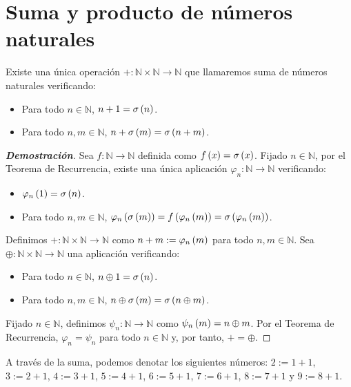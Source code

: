 \section{Suma y producto de números naturales}

\begin{proposition}
  \rm Existe una única operación $+:\mathbb{N}\times\mathbb{N}\rightarrow\mathbb{N}$ que llamaremos suma de números naturales verificando:

  \begin{itemize}
    \item[1.] Para todo $n\in\mathbb{N}$, $n+1=\sigma\left(n\right)$.
    \item[2.] Para todo $n,m\in\mathbb{N}$, $n+\sigma\left(m\right)=\sigma\left(n+m\right)$.
  \end{itemize}
\begin{proof}[\rm\textbf{Demostración}]
  Sea $f:\mathbb{N}\rightarrow\mathbb{N}$ definida como $f\left(x\right)=\sigma\left(x\right)$. Fijado $n\in\mathbb{N}$, por el Teorema de Recurrencia, existe una única aplicación $\varphi_n:\mathbb{N}\rightarrow\mathbb{N}$ verificando:

  \begin{itemize}
  \item[1.] $\varphi_n\left(1\right)=\sigma\left(n\right)$.
  \item[2.] Para todo $n,m\in\mathbb{N}$, $\varphi_n\left(\sigma\left(m\right)\right)=f\left(\varphi_n\left(m\right)\right)=\sigma\left(\varphi_n\left(m\right)\right)$.
  \end{itemize}
  
  Definimos $+:\mathbb{N}\times\mathbb{N}\rightarrow\mathbb{N}$ como $n+m:=\varphi_n\left(m\right)$ para todo $n,m\in\mathbb{N}$. Sea $\oplus:\mathbb{N}\times\mathbb{N}\rightarrow\mathbb{N}$ una aplicación verificando:

  \begin{itemize}
    \item[1.] Para todo $n\in\mathbb{N}$, $n\oplus 1=\sigma\left(n\right)$.
    \item[2.] Para todo $n,m\in\mathbb{N}$, $n\oplus\sigma\left(m\right)=\sigma\left(n\oplus m\right)$.
  \end{itemize}

  Fijado $n\in\mathbb{N}$, definimos $\psi_n:\mathbb{N}\rightarrow\mathbb{N}$ como $\psi_n\left(m\right)=n\oplus m$. Por el Teorema de Recurrencia, $\varphi_n=\psi_n$ para todo $n\in\mathbb{N}$ y, por tanto, $+=\oplus$.
\end{proof}
\end{proposition}

A través de la suma, podemos denotar los siguientes números: $2:=1+1$, $3:=2+1$, $4:=3+1$, $5:=4+1$, $6:=5+1$, $7:=6+1$, $8:=7+1$ y $9:=8+1$.

